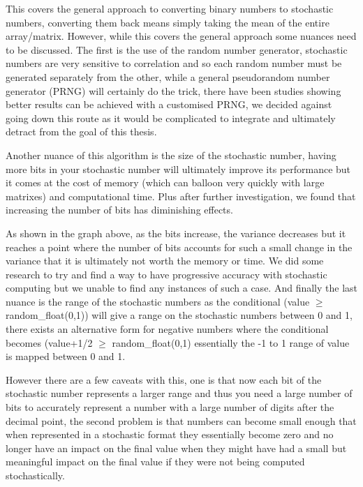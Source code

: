 \documentclass[a4paper,oneside,phd,etd]{BYUPhys}
\begin{document}
This covers the general approach to converting binary numbers to stochastic numbers, converting them back means simply taking the mean of the entire array/matrix. However, while this covers the general approach some nuances need to be discussed. The first is the use of the random number generator, stochastic numbers are very sensitive to correlation\cite{8342234} and so each random number must be generated separately from the other, while a general pseudorandom number generator (PRNG) will certainly do the trick, there have been studies showing better results can be achieved with a customised PRNG\cite{lee2019synthesizing}, we decided against going down this route as it would be complicated to integrate and ultimately detract from the goal of this thesis.

Another nuance of this algorithm is the size of the stochastic number, having more bits in your stochastic number will ultimately improve its performance but it comes at the cost of memory (which can balloon very quickly with large matrixes) and computational time. Plus after further investigation, we found that increasing the number of bits has diminishing effects.

As shown in the graph above, as the bits increase, the variance decreases but it reaches a point where the number of bits accounts for such a small change in the variance that it is ultimately not worth the memory or time. We did some research to try and find a way to have progressive accuracy with stochastic computing but we unable to find any instances of such a case. And finally the last nuance is the range of the stochastic numbers as the conditional (value $\geq$ random\_float(0,1)) will give a range on the stochastic numbers between 0 and 1, there exists an alternative form for negative numbers where the conditional becomes (value+1/2 $\geq$ random\_float(0,1) essentially the -1 to 1 range of value is mapped between 0 and 1. 

However there are a few caveats with this, one is that now each bit of the stochastic number represents a larger range and thus you need a large number of bits to accurately represent a number with a large number of digits after the decimal point, the second problem is that numbers can become small enough that when represented in a stochastic format they essentially become zero and no longer have an impact on the final value when they might have had a small but meaningful impact on the final value if they were not being computed stochastically. 
\end{document}

